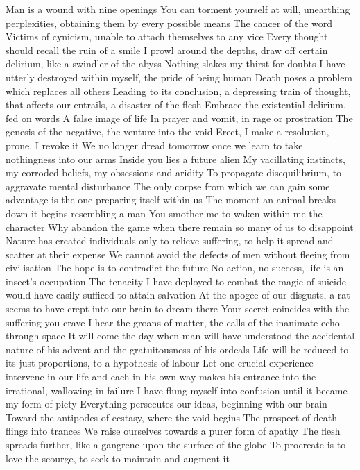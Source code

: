 \documentclass{article}
\begin{document}
Man is a wound with nine openings
You can torment yourself at will, unearthing perplexities, obtaining them by every possible means
The cancer of the word
Victims of cynicism, unable to attach themselves to any vice
Every thought should recall the ruin of a smile
I prowl around the depths, draw off certain delirium, like a swindler of the abyss
Nothing slakes my thirst for doubts
I have utterly destroyed within myself, the pride of being human
Death poses a problem which replaces all others
Leading to its conclusion, a depressing train of thought, that affects our entrails, a disaster of the flesh
Embrace the existential delirium, fed on words
A false image of life
In prayer and vomit, in rage or prostration
The genesis of the negative, the venture into the void
Erect, I make a resolution, prone, I revoke it
We no longer dread tomorrow once we learn to take nothingness into our arms
Inside you lies a future alien
My vacillating instincts, my corroded beliefs, my obsessions and aridity
To propagate disequilibrium, to aggravate mental disturbance
The only corpse from which we can gain some advantage is the one preparing itself within us
The moment an animal breaks down it begins resembling a man
You smother me to waken within me the character
Why abandon the game when there remain so many of us to disappoint
Nature has created individuals only to relieve suffering, to help it spread and scatter at their expense
We cannot avoid the defects of men without fleeing from civilisation
The hope is to contradict the future
No action, no success, life is an insect's occupation
The tenacity I have deployed to combat the magic of suicide would have easily sufficed to attain salvation
At the apogee of our disgusts, a rat seems to have crept into our brain to dream there
Your secret coincides with the suffering you crave
I hear the groans of matter, the calls of the inanimate echo through space
It will come the day when man will have understood the accidental nature of his advent and the gratuitousness of his ordeals
Life will be reduced to its just proportions, to a hypothesis of labour
Let one crucial experience intervene in our life and each in his own way makes his entrance into the irrational, wallowing in failure
I have flung myself into confusion until it became my form of piety
Everything persecutes our ideas, beginning with our brain
Toward the antipodes of ecstasy, where the void begins
The prospect of death flings into trances
We raise ourselves towards a purer form of apathy
The flesh spreads further, like a gangrene upon the surface of the globe
To procreate is to love the scourge, to seek to maintain and augment it
\end{document}
